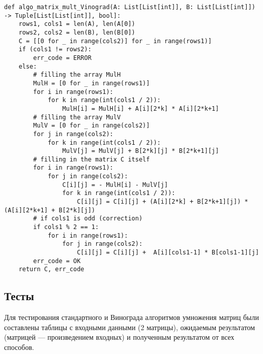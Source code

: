 \vspace{0.25cm}
\begin{lstlisting}[caption=реализация алгоритма Винограда умножения матриц, label=lst:Vinograd]
def algo_matrix_mult_Vinograd(A: List[List[int]], B: List[List[int]]) -> Tuple[List[List[int]], bool]:
    rows1, cols1 = len(A), len(A[0])
    rows2, cols2 = len(B), len(B[0])
    C = [[0 for _ in range(cols2)] for _ in range(rows1)]
    if (cols1 != rows2):
        err_code = ERROR
    else:
        # filling the array MulH
        MulH = [0 for _ in range(rows1)]
        for i in range(rows1):
            for k in range(int(cols1 / 2)):
                MulH[i] = MulH[i] + A[i][2*k] * A[i][2*k+1]
        # filling the array MulV
        MulV = [0 for _ in range(cols2)]
        for j in range(cols2):
            for k in range(int(cols1 / 2)):
                MulV[j] = MulV[j] + B[2*k][j] * B[2*k+1][j]
        # filling in the matrix C itself
        for i in range(rows1):
            for j in range(cols2):
                C[i][j] = - MulH[i] - MulV[j]
                for k in range(int(cols1 / 2)):
                    C[i][j] = C[i][j] + (A[i][2*k] + B[2*k+1][j]) * (A[i][2*k+1] + B[2*k][j])
        # if cols1 is odd (correction)
        if cols1 % 2 == 1:
            for i in range(rows1):
                for j in range(cols2):
                    C[i][j] = C[i][j] +  A[i][cols1-1] * B[cols1-1][j]
        err_code = OK
    return C, err_code
\end{lstlisting}

\vspace{0.25cm}
\subsection{Тесты}

\hspace{1.25cm}
Для тестирования стандартного и Винограда алгоритмов умножения матриц были составлены таблицы с входными данными (2 матрицы), ожидаемым результатом (матрицей --- произведением входных) и полученным результатом от всех способов.


